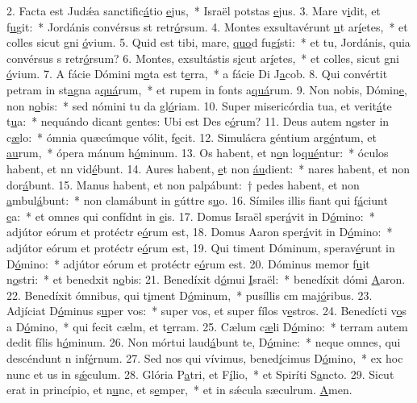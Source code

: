2. Facta est Judǽa sanctific\uline{á}tio \uline{e}jus,~* Israël potstas \uline{e}jus.
3. Mare v\uline{i}dit, et f\uline{u}git:~* Jordánis convérsus st retr\uline{ó}rsum.
4. Montes exsultavérunt \uline{u}t ar\uline{í}etes,~* et colles sicut gni \uline{ó}vium.
5. Quid est tibi, mare, \uline{quo}d fug\uline{í}sti:~* et tu, Jordánis, quia convérsus s retr\uline{ó}rsum?
6. Montes, exsultástis s\uline{i}cut ar\uline{í}etes,~* et colles, sicut gni \uline{ó}vium.
7. A fácie Dómini m\uline{o}ta est t\uline{e}rra,~* a fácie Di J\uline{a}cob.
8. Qui convértit petram in st\uline{a}gna a\uline{quá}rum,~* et rupem in fonts a\uline{quá}rum.
9. Non nobis, Dómin\uline{e}, non n\uline{o}bis:~* sed nómini tu da gl\uline{ó}riam.
10. Super misericórdia tua, et verit\uline{á}te t\uline{u}a:~* nequándo dicant gentes: Ubi est Des e\uline{ó}rum?
11. Deus autem n\uline{o}ster in c\uline{æ}lo:~* ómnia quæcúmque vólit, f\uline{e}cit.
12. Simulácra géntium arg\uline{é}ntum, et \uline{au}rum,~* ópera mánum h\uline{ó}minum.
13. Os habent, et n\uline{o}n lo\uline{qué}ntur:~* óculos habent, et nn vid\uline{é}bunt.
14. Aures habent, \uline{e}t non \uline{áu}dient:~* nares habent, et non dor\uline{á}bunt.
15. Manus habent, et non palpábunt:~† pedes habent, et non \uline{a}mbul\uline{á}bunt:~* non clamábunt in gúttre s\uline{u}o.
16. Símiles illis fiant qui f\uline{á}ciunt \uline{e}a:~* et omnes qui confídnt in \uline{e}is.
17. Domus Israël sper\uline{á}vit in D\uline{ó}mino:~* adjútor eórum et protéctr e\uline{ó}rum est,
18. Domus Aaron sper\uline{á}vit in D\uline{ó}mino:~* adjútor eórum et protéctr e\uline{ó}rum est,
19. Qui timent Dóminum, sperav\uline{é}runt in D\uline{ó}mino:~* adjútor eórum et protéctr e\uline{ó}rum est.
20. Dóminus memor f\uline{u}it n\uline{o}stri:~* et benedxit n\uline{o}bis:
21. Benedíxit d\uline{ó}mui \uline{I}sraël:~* benedíxit dómi \uline{A}aron.
22. Benedíxit ómnibus, qui t\uline{i}ment D\uline{ó}minum,~* pusíllis cm maj\uline{ó}ribus.
23. Adjíciat D\uline{ó}minus s\uline{u}per vos:~* super vos, et super fílos v\uline{e}stros.
24. Benedícti v\uline{o}s a D\uline{ó}mino,~* qui fecit cælm, et t\uline{e}rram.
25. Cælum c\uline{æ}li D\uline{ó}mino:~* terram autem dedit fílis h\uline{ó}minum.
26. Non mórtui laud\uline{á}bunt te, D\uline{ó}mine:~* neque omnes, qui descéndunt n inf\uline{é}rnum.
27. Sed nos qui vívimus, bened\uline{í}cimus D\uline{ó}mino,~* ex hoc nunc et us in s\uline{ǽ}culum.
28. Glória P\uline{a}tri, et F\uline{í}lio,~* et Spiríti S\uline{a}ncto.
29. Sicut erat in princípio, et n\uline{u}nc, et s\uline{e}mper,~* et in sǽcula sæculrum. \uline{A}men.
